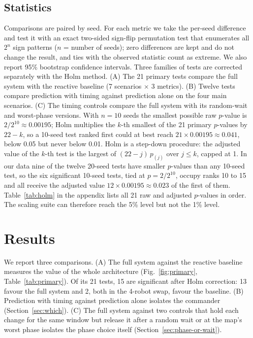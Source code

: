 \documentclass[pdflatex,sn-mathphys-num]{sn-jnl}
\begin{document}
\subsection{Statistics}
Comparisons are paired by seed. For each metric we take the per-seed difference and test it with an exact
two-sided sign-flip permutation test that enumerates all $2^n$ sign patterns ($n$ = number of seeds);
zero differences are kept and do not change the result, and ties with the observed statistic count as
extreme. We also report 95\% bootstrap confidence intervals. Three families of tests are corrected
separately with the Holm method. (A) The 21 primary tests compare the full system with the reactive
baseline (7 scenarios $\times$ 3 metrics). (B) Twelve tests compare prediction with timing against
prediction alone on the four main scenarios. (C) The timing controls compare the full system with its
random-wait and worst-phase versions. With $n = 10$ seeds the smallest possible raw $p$-value is
$2/2^{10} \approx 0.00195$; Holm multiplies the $k$-th smallest of the 21 primary $p$-values by $22-k$, so
a 10-seed test ranked first could at best reach $21 \times 0.00195 \approx 0.041$, below 0.05 but never
below 0.01. Holm is a step-down procedure: the adjusted value of the $k$-th test is the largest of
$(22-j)\,p_{(j)}$ over $j \le k$, capped at 1. In our data nine of the twelve 20-seed tests have smaller
$p$-values than any 10-seed test, so the six significant 10-seed tests, tied at $p = 2/2^{10}$, occupy ranks
10 to 15 and all receive the adjusted value $12 \times 0.00195 \approx 0.023$ of the first of them.
Table~\ref{tab:holm} in the appendix lists all 21 raw and adjusted $p$-values in order. The scaling suite
can therefore reach the 5\% level but not the 1\% level.

\section{Results}\label{sec:results}

We report three comparisons. (A) The full system against the reactive baseline measures the value of the
whole architecture (Fig.~\ref{fig:primary}, Table~\ref{tab:primary}). Of its 21 tests, 15 are significant
after Holm correction: 13 favour the full system and 2, both in the 4-robot swap, favour the baseline.
(B) Prediction with timing against prediction alone isolates the commander (Section~\ref{sec:which}). (C) The
full system against two controls that hold each change for the same window but release it after a random
wait or at the map's worst phase isolates the phase choice itself (Section~\ref{sec:phase-or-wait}).
\end{document}
